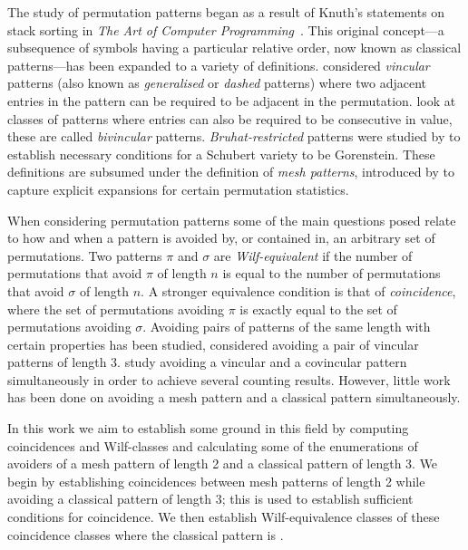 The study of permutation patterns began as a result of Knuth's statements on
stack sorting in \emph{The Art of Computer Programming}~\cite[p.~243,
Ex.~5,6]{Knuth:1997:ACP:260999}. This original concept---a subsequence of
symbols having a particular relative order, now known as classical
patterns---has been expanded to a variety of definitions.
\textcite{babstein2000} considered \emph{vincular} patterns (also known as
\emph{generalised} or \emph{dashed} patterns) where two adjacent entries in the
pattern can be required to be adjacent in the permutation. \textcite{MR2652101}
look at classes of patterns where entries can also be required to be consecutive in
value, these are called \emph{bivincular} patterns. \emph{Bruhat-restricted}
patterns were studied by \textcite{MR2264071} to establish necessary conditions
for a Schubert variety to be Gorenstein. These definitions are subsumed under
the definition of \emph{mesh patterns}, introduced by
\textcite{journals/combinatorics/BrandenC11} to capture explicit expansions for
certain permutation statistics.

When considering permutation patterns some of the main questions posed relate to
how and when a pattern is avoided by, or contained in, an arbitrary set of
permutations. Two patterns \(\pi\) and \(\sigma\) are \emph{Wilf-equivalent} if
the number of permutations that avoid \(\pi\) of length \(n\) is equal to the
number of permutations that avoid \(\sigma\) of length \(n\). A stronger
equivalence condition is that of \emph{coincidence}, where the set of
permutations avoiding \(\pi\) is exactly equal to the set of permutations
avoiding \(\sigma\). Avoiding pairs of patterns of the same length with certain
properties has been studied, \textcite{MR2178749} considered avoiding
a pair of vincular patterns of length 3. \textcite{2015arXiv151203226B} study
avoiding a vincular and a covincular pattern simultaneously in order to achieve
several counting results. However, little work has been done on
avoiding a mesh pattern and a classical pattern simultaneously.

In this work we aim to establish some ground in this field by computing
coincidences and Wilf-classes and calculating some of the enumerations of
avoiders of a mesh pattern of length 2 and a classical pattern of length 3. We
begin by establishing coincidences between mesh patterns of length 2 while
avoiding a classical pattern of length 3; this is used to establish sufficient
conditions for coincidence. We then establish Wilf-equivalence classes of these
coincidence classes where the classical pattern is .
